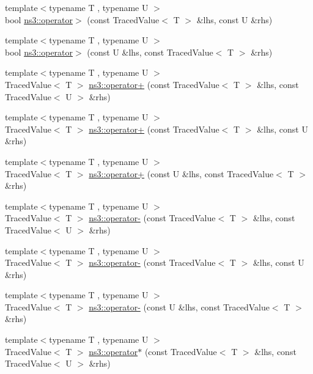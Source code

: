 \begin{DoxyCompactItemize}
{\footnotesize template$<$typename T , typename U $>$ }\\bool \hyperlink{group__tracing_ga3f02ac6f8a32bcca7fb2300d363862bd}{ns3\+::operator$>$} (const Traced\+Value$<$ T $>$ \&lhs, const U \&rhs)
\item 
{\footnotesize template$<$typename T , typename U $>$ }\\bool \hyperlink{group__tracing_gabd7685a58b0f7cb7f8f53ef06554828f}{ns3\+::operator$>$} (const U \&lhs, const Traced\+Value$<$ T $>$ \&rhs)
\item 
{\footnotesize template$<$typename T , typename U $>$ }\\Traced\+Value$<$ T $>$ \hyperlink{group__tracing_ga782eccee1c7da9925ce63f8f2d045930}{ns3\+::operator+} (const Traced\+Value$<$ T $>$ \&lhs, const Traced\+Value$<$ U $>$ \&rhs)
\item 
{\footnotesize template$<$typename T , typename U $>$ }\\Traced\+Value$<$ T $>$ \hyperlink{group__tracing_gae790ba5a5fae7b7649946b432498a4cb}{ns3\+::operator+} (const Traced\+Value$<$ T $>$ \&lhs, const U \&rhs)
\item 
{\footnotesize template$<$typename T , typename U $>$ }\\Traced\+Value$<$ T $>$ \hyperlink{group__tracing_ga14b0725265337cb5d0eaa021544c5a65}{ns3\+::operator+} (const U \&lhs, const Traced\+Value$<$ T $>$ \&rhs)
\item 
{\footnotesize template$<$typename T , typename U $>$ }\\Traced\+Value$<$ T $>$ \hyperlink{group__tracing_ga27cee014078fb0a7dad0e83e22d348b8}{ns3\+::operator-\/} (const Traced\+Value$<$ T $>$ \&lhs, const Traced\+Value$<$ U $>$ \&rhs)
\item 
{\footnotesize template$<$typename T , typename U $>$ }\\Traced\+Value$<$ T $>$ \hyperlink{group__tracing_gad41ceb4510644aff80fb16c9ab94a63b}{ns3\+::operator-\/} (const Traced\+Value$<$ T $>$ \&lhs, const U \&rhs)
\item 
{\footnotesize template$<$typename T , typename U $>$ }\\Traced\+Value$<$ T $>$ \hyperlink{group__tracing_gafaf9fc8dc508b1c51a5be851fb6aca0b}{ns3\+::operator-\/} (const U \&lhs, const Traced\+Value$<$ T $>$ \&rhs)
\item 
{\footnotesize template$<$typename T , typename U $>$ }\\Traced\+Value$<$ T $>$ \hyperlink{group__tracing_ga849d6e45a8026bcd4579e0700ce015ef}{ns3\+::operator$\ast$} (const Traced\+Value$<$ T $>$ \&lhs, const Traced\+Value$<$ U $>$ \&rhs)

\end{DoxyCompactItemize}
